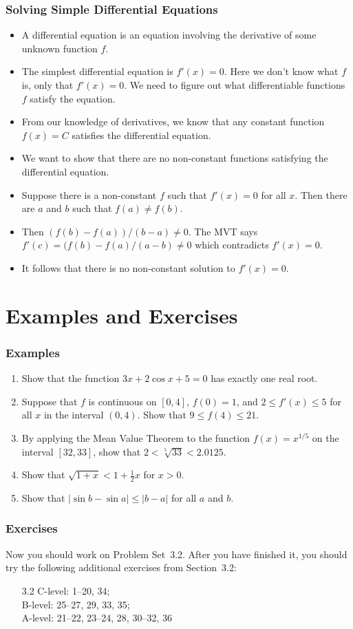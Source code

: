 \documentclass[serif,ignorenonframetext]{beamer}
\newcommand{\ds}{\displaystyle}
\begin{document}
\begin{frame}
  \frametitle{Solving Simple Differential Equations}
  \begin{itemize}[<+->]
  \item A differential equation is an equation involving the 
    derivative of some unknown function $f$.
  \item The simplest differential equation is $f'(x)=0$.  Here
    we don't know what $f$ is, only that $f'(x)=0$.  We need to figure
    out what differentiable functions $f$ satisfy the equation.
  \item From our knowledge of derivatives, we know that any constant 
    function $f(x)=C$ satisfies the differential equation.
  \item We want to show that there are no non-constant functions satisfying
    the differential equation.
  \item Suppose there is a non-constant $f$ such that $f'(x)=0$ for all $x$.
    Then there are $a$ and $b$ such that $f(a)\ne f(b)$.
  \item Then $(f(b)-f(a))/(b-a)\ne 0$.  
    The MVT says $f'(c)=(f(b)-f(a)/(a-b) \ne 0$ which contradicts 
    $f'(x)=0$.
  \item It follows that there is no non-constant solution to $f'(x)=0$.
  \end{itemize}
\end{frame}


\section{Examples and Exercises}

\begin{frame}
  \frametitle{Examples}
  \begin{enumerate}
  \item Show that the function $\ds 3x + 2\cos x + 5 = 0$ has exactly
    one real root.
  \item Suppose that $f$ is continuous on $[0,4]$, $f(0)=1$, and
    $\ds 2\le f'(x)\le 5$ for all $x$ in the interval $(0,4)$.  Show that
    $\ds 9\le f(4)\le 21$.
  \item By applying the Mean Value Theorem to the function $\ds f(x)=x^{1/5}$
    on the interval $[32,33]$, show that $\ds 2<\sqrt[5]{33}<2.0125$.
  \item Show that $\sqrt{1+x}<1+\frac{1}{2} x$ for $x>0$.
  \item Show that $|\sin b-\sin a| \le |b-a|$ for all $a$ and $b$.
  \end{enumerate} 
\end{frame}

\begin{frame}
  \frametitle{Exercises}
  Now you should work on Problem Set~3.2.  After you have finished it,
  you should try the following additional exercises from Section~3.2:
  \begin{itemize}
  \item[3.2] 
    C-level: 1--20, 34; \\
    B-level: 25--27, 29, 33, 35; \\
    A-level: 21--22, 23--24, 28, 30--32, 36
  \end{itemize}
\end{frame}
\end{document}
